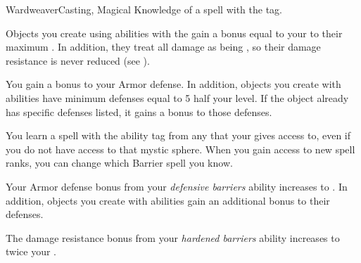   \begin{magicalfeat}{Wardweaver}{Casting, Magical}
    \featpre Knowledge of a spell with the  tag.

     Objects you create using abilities with the   gain a bonus equal to your  to their maximum .
    In addition, they treat all damage as being , so their damage resistance is never reduced (see ).

     You gain a  bonus to your Armor defense.
    In addition, objects you create with  abilities have minimum defenses equal to 5 \add half your level.
    If the object already has specific defenses listed, it gains a  bonus to those defenses.

     You learn a spell with the  ability tag from any  that your  gives access to, even if you do not have access to that mystic sphere.
    When you gain access to new spell ranks, you can change which Barrier spell you know.

     Your Armor defense bonus from your \textit{defensive barriers} ability increases to .
    In addition, objects you create with  abilities gain an additional  bonus to their defenses.

     The damage resistance bonus from your \textit{hardened barriers} ability increases to twice your .
  \end{magicalfeat}

